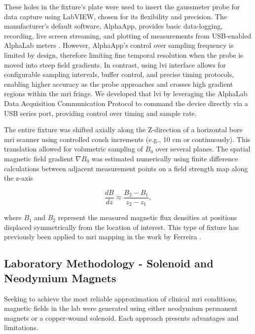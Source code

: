 These holes in the fixture's plate were used to insert the gaussmeter probe for data capture using LabVIEW, chosen for its flexibility and precision. The manufacturer’s default software, AlphaApp, provides basic data‑logging, recording, live screen streaming, and plotting of measurements from USB‑enabled AlphaLab meters \cite{AlphaApp}. However, AlphaApp's control over sampling frequency is limited by design, therefore limiting fine temporal resolution when the probe is moved into steep field gradients. In contrast, using \gls{lvi} interface allows for configurable sampling intervals, buffer control, and precise timing protocols, enabling higher accuracy as the probe approaches and crosses high gradient regions within the \gls{mri} fringe. We developed that \gls{lvi} by leveraging the AlphaLab Data Acquisition Communication Protocol \cite{AlphaAppProtocol} to command the device directly via a USB series port, providing control over timing and sample rate. %

The entire fixture was shifted axially along the Z-direction of a horizontal bore \gls{mri} scanner using controlled couch increments (e.g., 10 cm or continuously). This translation allowed for volumetric sampling of $B_0$ over several planes. The spatial magnetic field gradient $\nabla B_0$ was estimated numerically using finite difference calculations between adjacent measurement points on a field strength map along the z-axis

\begin{equation}
	\label{eq:finiteDiff}
	\frac{dB}{dz} \approx \frac{B_2 - B_1}{z_2 - z_1},
\end{equation}

\noindent where $B_1$ and $B_2$ represent the measured magnetic flux densities at positions displaced symmetrically from the location of interest. This type of fixture has previously been applied to \gls{mri} mapping in the work by Ferreira \cite{ferreira2017}.


\subsection{Laboratory Methodology - Solenoid and Neodymium Magnets}
\label{sec:labMagnets}

Seeking to achieve the most reliable approximation of clinical \gls{mri} conditions, magnetic fields in the lab were generated using either neodymium permanent magnets or a copper-wound solenoid. Each approach presents advantages and limitations. 

